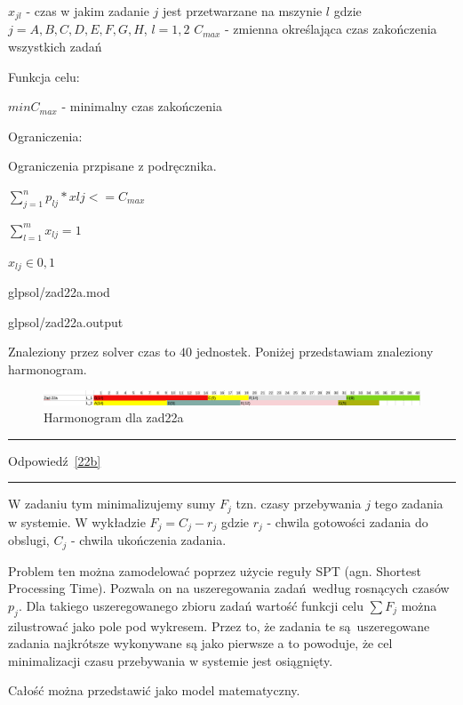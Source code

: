 \documentclass{article}
\begin{document}
$x_{jl}$ - czas w jakim zadanie $j$ jest przetwarzane na mszynie $l$ gdzie $j = {A,B,C,D,E,F,G,H}$, $l = {1,2}$ 
$C_{max}$ - zmienna określająca czas zakończenia wszystkich zadań

\noindent Funkcja celu:

$min C_{max}$ - minimalny czas zakończenia

\noindent Ograniczenia:

Ograniczenia przpisane z podręcznika.

$\sum^{n}_{j = 1} p_{lj}*x{lj} <= C_{max}$

$\sum^{m}_{l = 1} x_{lj} = 1$

$x_{lj} \in {0,1}$


{glpsol/zad22a.mod}


{glpsol/zad22a.output}

Znaleziony przez solver czas to $40$ jednostek. Poniżej przedstawiam znaleziony harmonogram.

\begin{figure}[h]    
  \centering    
  \includegraphics[width=\linewidth]{others/zad22a_harmonogram.png}
  \caption{Harmonogram dla zad22a}
\end{figure}

\par\noindent\rule{\textwidth}{0.4pt}
Odpowiedź \ref{22b}
\par\noindent\rule{\textwidth}{0.4pt}

W zadaniu tym minimalizujemy sumy $F_j$ tzn. czasy przebywania $j$ tego zadania w systemie. W wykładzie 
$F_j = C_j - r_j$ gdzie $r_j$ - chwila gotowości zadania do obslugi, $C_j$ - chwila ukończenia zadania.

Problem ten można zamodelować poprzez użycie reguły SPT (agn. Shortest Processing Time). Pozwala on na uszeregowania zadań według rosnących czasów $p_j$. Dla takiego uszeregowanego zbioru zadań wartość funkcji celu $\sum{}F_j$ można zilustrować jako pole pod wykresem. Przez to, że zadania te są uszeregowane zadania najkrótsze wykonywane są jako pierwsze a to powoduje, że cel minimalizacji czasu przebywania w systemie jest osiągnięty.

Całość można przedstawić jako model matematyczny.
\end{document}
